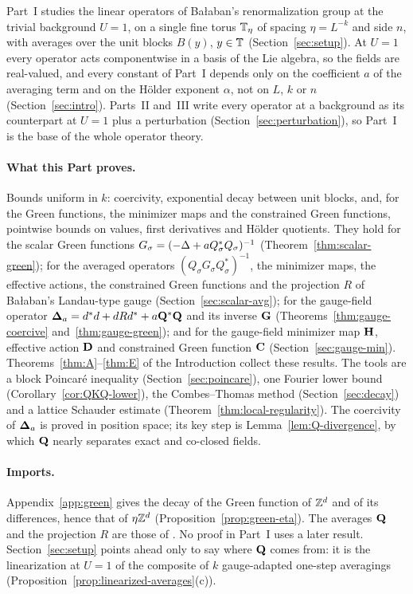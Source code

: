 \label{intro:I}
Part~I studies the linear operators of Ba\l aban's renormalization group at the trivial background $U=1$, on a single fine torus $\mathbb T_\eta$ of spacing $\eta=L^{-k}$ and side $n$, with averages over the unit blocks $B(y)$, $y\in\mathbb T$ (Section~\ref{sec:setup}). At $U=1$ every operator acts componentwise in a basis of the Lie algebra, so the fields are real-valued, and every constant of Part~I depends only on the coefficient $a$ of the averaging term and on the H\"older exponent $\alpha$, not on $L$, $k$ or $n$ (Section~\ref{sec:intro}). Parts~II and~III write every operator at a background as its counterpart at $U=1$ plus a perturbation (Section~\ref{sec:perturbation}), so Part~I is the base of the whole operator theory.

\paragraph{What this Part proves.} Bounds uniform in $k$: coercivity, exponential decay between unit blocks, and, for the Green functions, the minimizer maps and the constrained Green functions, pointwise bounds on values, first derivatives and H\"older quotients. They hold for the scalar Green functions $G_\sigma=(-\Delta+aQ_\sigma^*Q_\sigma)^{-1}$ (Theorem~\ref{thm:scalar-green}); for the averaged operators $(Q_\sigma G_\sigma Q_\sigma^*)^{-1}$, the minimizer maps, the effective actions, the constrained Green functions and the projection $R$ of Ba\l aban's Landau-type gauge (Section~\ref{sec:scalar-avg}); for the gauge-field operator $\boldsymbol{\Delta}_a=d^*d+dRd^*+a\mathbf Q^*\mathbf Q$ and its inverse $\mathbf G$ (Theorems~\ref{thm:gauge-coercive} and~\ref{thm:gauge-green}); and for the gauge-field minimizer map $\mathbf H$, effective action $\mathbf D$ and constrained Green function $\mathbf C$ (Section~\ref{sec:gauge-min}). Theorems~\ref{thm:A}--\ref{thm:E} of the Introduction collect these results. The tools are a block Poincar\'e inequality (Section~\ref{sec:poincare}), one Fourier lower bound (Corollary~\ref{cor:QKQ-lower}), the Combes--Thomas method (Section~\ref{sec:decay}) and a lattice Schauder estimate (Theorem~\ref{thm:local-regularity}). The coercivity of $\boldsymbol{\Delta}_a$ is proved in position space; its key step is Lemma~\ref{lem:Q-divergence}, by which $\mathbf Q$ nearly separates exact and co-closed fields.

\paragraph{Imports.} Appendix~\ref{app:green} gives the decay of the Green function of $\mathbb Z^d$ and of its differences, hence that of $\eta\mathbb Z^d$ (Proposition~\ref{prop:green-eta}). The averages $\mathbf Q$ and the projection $R$ are those of \cite{BalPropI}. No proof in Part~I uses a later result. Section~\ref{sec:setup} points ahead only to say where $\mathbf Q$ comes from: it is the linearization at $U=1$ of the composite of $k$ gauge-adapted one-step averagings (Proposition~\ref{prop:linearized-averages}(c)).

